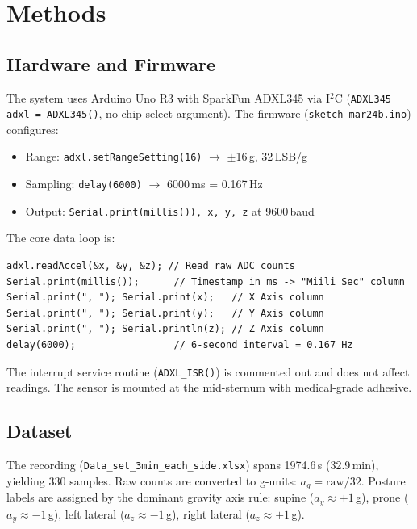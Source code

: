 \documentclass[journal]{IEEEtran}
\begin{document}
\section{Methods}

\subsection{Hardware and Firmware}

The system uses Arduino Uno R3 with SparkFun ADXL345 via I$^{2}$C
(\texttt{ADXL345 adxl = ADXL345()}, no chip-select argument).
The firmware (\texttt{sketch\_mar24b.ino}) configures:

\begin{itemize}
    \item Range: \texttt{adxl.setRangeSetting(16)} $\rightarrow$ $\pm$16\,g, 32\,LSB/g
    \item Sampling: \texttt{delay(6000)} $\rightarrow$ 6000\,ms = 0.167\,Hz
    \item Output: \texttt{Serial.print(millis()), x, y, z} at 9600\,baud
\end{itemize}

The core data loop is:

\begin{lstlisting}[caption={Data logging loop -- sketch\_mar24b.ino}]
adxl.readAccel(&x, &y, &z); // Read raw ADC counts
Serial.print(millis());      // Timestamp in ms -> "Miili Sec" column
Serial.print(", "); Serial.print(x);   // X Axis column
Serial.print(", "); Serial.print(y);   // Y Axis column
Serial.print(", "); Serial.println(z); // Z Axis column
delay(6000);                 // 6-second interval = 0.167 Hz
\end{lstlisting}

The interrupt service routine (\texttt{ADXL\_ISR()}) is commented out and does not
affect readings. The sensor is mounted at the mid-sternum with medical-grade adhesive.

\subsection{Dataset}

The recording (\texttt{Data\_set\_3min\_each\_side.xlsx}) spans 1974.6\,s (32.9\,min),
yielding 330 samples. Raw counts are converted to g-units: $a_g = \text{raw}/32$.
Posture labels are assigned by the dominant gravity axis rule:
supine ($a_y \approx +1$\,g), prone ($a_y \approx -1$\,g),
left lateral ($a_z \approx -1$\,g), right lateral ($a_z \approx +1$\,g).
\end{document}
